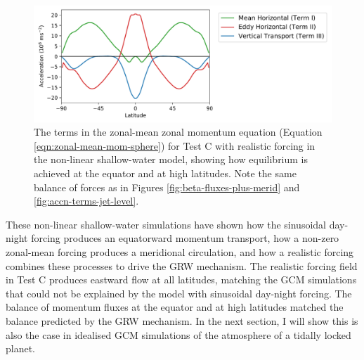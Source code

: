 \begin{figure}
  \centering
  \includegraphics[width=1.0\textwidth]{figures/eqm-zonal-flow/nonlin-balance.pdf}
  \caption{The terms in the zonal-mean zonal momentum equation (Equation \ref{eqn:zonal-mean-mom-sphere}) for Test C with realistic forcing in the non-linear shallow-water model, showing how equilibrium is achieved at the equator and at high latitudes. Note the same balance of forces as in Figures \ref{fig:beta-fluxes-plus-merid} and \ref{fig:accn-terms-jet-level}.}\label{fig:test-C-accn}
\end{figure}


These non-linear shallow-water simulations have shown how the sinusoidal day-night forcing produces an equatorward momentum transport, how a non-zero zonal-mean forcing produces a meridional circulation, and how a realistic forcing combines these processes to drive the GRW mechanism. The realistic forcing field in Test C produces eastward flow at all latitudes, matching the GCM simulations that could not be explained by the model with sinusoidal day-night forcing. The balance of momentum fluxes at the equator and at high latitudes matched the balance predicted by the GRW mechanism. In the next section, I will show this is also the case in idealised GCM simulations of the atmosphere of a tidally locked planet.




%





